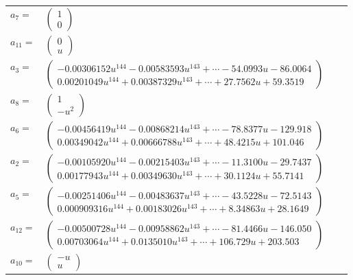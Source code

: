 \documentclass[1p]{elsarticle_modified}
\theoremstyle{definition}
\begin{document}
\begin{tabular}{m{7pt} m{180pt} m{7pt} m{180pt} }
\flushright $a_{7}=$&$\begin{pmatrix}1\\0\end{pmatrix}$ \\
\flushright $a_{11}=$&$\begin{pmatrix}0\\u\end{pmatrix}$ \\
\flushright $a_{3}=$&$\begin{pmatrix}-0.00306152 u^{144}-0.00583593 u^{143}+\cdots-54.0993 u-86.0064\\0.00201049 u^{144}+0.00387329 u^{143}+\cdots+27.7562 u+59.3519\end{pmatrix}$ \\
\flushright $a_{8}=$&$\begin{pmatrix}1\\- u^2\end{pmatrix}$ \\
\flushright $a_{6}=$&$\begin{pmatrix}-0.00456419 u^{144}-0.00868214 u^{143}+\cdots-78.8377 u-129.918\\0.00349042 u^{144}+0.00666788 u^{143}+\cdots+48.4215 u+101.046\end{pmatrix}$ \\
\flushright $a_{2}=$&$\begin{pmatrix}-0.00105920 u^{144}-0.00215403 u^{143}+\cdots-11.3100 u-29.7437\\0.00177943 u^{144}+0.00349630 u^{143}+\cdots+30.1124 u+55.7141\end{pmatrix}$ \\
\flushright $a_{5}=$&$\begin{pmatrix}-0.00251406 u^{144}-0.00483637 u^{143}+\cdots-43.5228 u-72.5143\\0.000909316 u^{144}+0.00183026 u^{143}+\cdots+8.34863 u+28.1649\end{pmatrix}$ \\
\flushright $a_{12}=$&$\begin{pmatrix}-0.00500728 u^{144}-0.00958862 u^{143}+\cdots-81.4466 u-146.050\\0.00703064 u^{144}+0.0135010 u^{143}+\cdots+106.729 u+203.503\end{pmatrix}$ \\
\flushright $a_{10}=$&$\begin{pmatrix}- u\\u\end{pmatrix}$ \\

\end{tabular}
\end{document}
